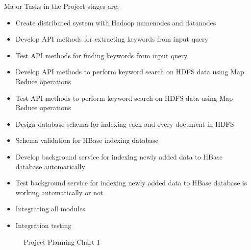 \documentclass[oneside,a4paper,12pt]{report}
\begin{document}
{\begin{appendices}
Major Tasks in the Project stages are:
\begin{itemize}
\item Create distributed system with Hadoop namenodes and datanodes
\item Develop API methods for extracting keywords from input query
\item Test API methods for finding keywords from input query
\item Develop API methods to perform keyword search on HDFS data using Map Reduce operations
\item Test API methods to perform keyword search on HDFS data using Map Reduce operations
\item Design database schema for indexing each and every document in HDFS
\item Schema validation for HBase indexing database
\item Develop background service for indexing newly added data to HBase database automatically
\item Test background service for indexing newly added data to HBase database is working automatically or not
\item Integrating all modules
\item Integration testing
\end{itemize}

\begin{center}
	\begin{figure}[!htbp]
		\centering
	  \caption{Project Planning Chart 1}
	  \label{fig:usecase}
	\end{figure}
\end{center} 


\end{appendices}}
\end{document}
